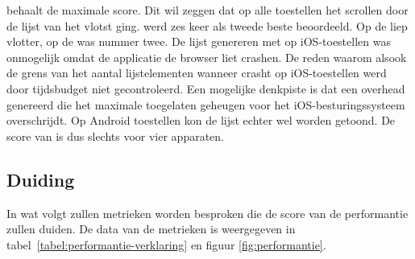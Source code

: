 \begin{table}[H]
\centering
{}
\caption{Gebruikerservaring voor \st{}~(\sta), \kendo{}~(\kendoa), \jqm{}~(\jqma) en \lungo{}~(\lungoa).}
\label{tabel:evaluatie-performantie-gebruikerservaring}
\end{table}

\st{} behaalt de maximale score.
Dit wil zeggen dat op alle toestellen het scrollen door de lijst van \st{} het vlotst ging.
\jqm{} werd zes keer als tweede beste beoordeeld. 
Op de \htc{} liep \kendo{} vlotter,  op de \ipadi{} was \lungo{} nummer twee.
De lijst genereren met \kendo{} op iOS-toestellen was onmogelijk omdat de applicatie de browser liet crashen.
De reden waarom alsook de grens van het aantal lijstelementen wanneer \kendo{} crasht op iOS-toestellen werd door tijdsbudget niet gecontroleerd.
Een mogelijke denkpiste is dat \kendo{} een overhead genereerd die het maximale toegelaten geheugen voor het iOS-besturingssysteem overschrijdt.
Op Android toestellen kon de \kendo{} lijst echter wel worden getoond.
De score van \kendo{} is dus slechts voor vier apparaten.



\subsection{Duiding}
\label{sec:evaluatie-performantie-duiding}

In wat volgt zullen metrieken worden besproken die de score van de performantie zullen duiden.
De data van de metrieken is weergegeven in tabel~\ref{tabel:performantie-verklaring} en figuur \ref{fig:performantie}.

